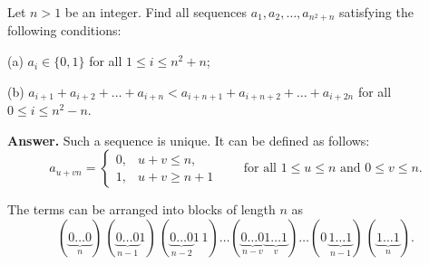Let $n > 1$ be an integer. Find all sequences $a_1, a_2, \ldots, a_{n^2+n}$ satisfying the following conditions:

(a) $a_i \in \{0, 1\}$ for all $1 \leq i \leq n^2 + n$;

(b) $a_{i+1} + a_{i+2} + \ldots + a_{i+n} < a_{i+n+1} + a_{i+n+2} + \ldots + a_{i+2n}$ for all $0 \leq i \leq n^2 - n$.

\textbf{Answer.} Such a sequence is unique. It can be defined as follows:
\[
a_{u+vn} = \begin{cases} 0, & u + v \leq n, \\ 1, & u + v \geq n + 1 \end{cases} \qquad \text{for all } 1 \leq u \leq n \text{ and } 0 \leq v \leq n. \tag{1}
\]

The terms can be arranged into blocks of length $n$ as
\[
(\underbrace{0 \ldots 0}_{n})\,(\underbrace{0 \ldots 0}_{n-1} 1)\,(\underbrace{0 \ldots 0}_{n-2} 1\,1) \ldots (\underbrace{0 \ldots 0}_{n-v} \underbrace{1 \ldots 1}_{v}) \ldots (0\,\underbrace{1 \ldots 1}_{n-1})\,(\underbrace{1 \ldots 1}_{n}).
\]
